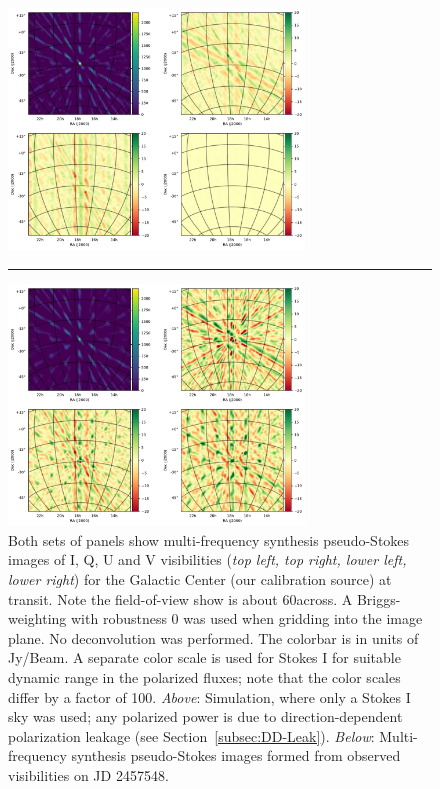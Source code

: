 \documentclass[twocolumn, trackchanges]{aastex61}
\begin{document}
\begin{figure}
\centering
\includegraphics[width=0.7\textwidth]{sim4pol_new.pdf}
\vspace{-0.1in}
\par\noindent\rule{0.8\textwidth}{0.4pt}
\includegraphics[width=0.7\textwidth]{real4pol_new.pdf}
\caption{Both sets of panels show multi-frequency synthesis pseudo-Stokes images
  of I, Q, U and V visibilities (\textit{top left, top right, lower left, lower
    right}) for the Galactic Center (our calibration source) at transit.  Note
  the field-of-view show is about 60\arcdeg across.  A Briggs-weighting with
  robustness 0 was used when gridding into the image plane.  No deconvolution
  was performed.  The colorbar is in units of Jy/Beam.  A separate color scale
  is used for Stokes I for suitable dynamic range in the polarized fluxes; note
  that the color scales differ by a factor of 100.  \textit{Above}: Simulation,
  where only a Stokes I sky was used; any polarized power is due to
  direction-dependent polarization leakage (see Section~\ref{subsec:DD-Leak}).
  \textit{Below}: Multi-frequency synthesis pseudo-Stokes images formed from
  observed visibilities on JD 2457548.}
\label{fig:GCimage}
\end{figure}
\end{document}

